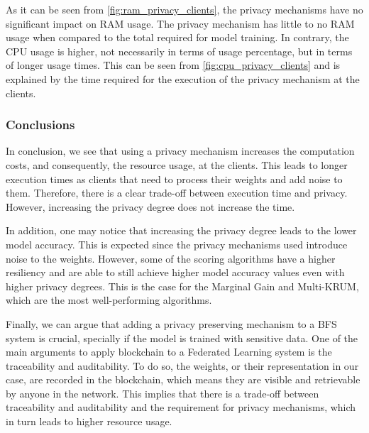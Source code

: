 As it can be seen from \autoref{fig:ram_privacy_clients}, the privacy mechanisms have no significant impact on RAM usage. The privacy mechanism has little to no RAM usage when compared to the total required for model training. In contrary, the CPU usage is higher, not necessarily in terms of usage percentage, but in terms of longer usage times. This can be seen from \autoref{fig:cpu_privacy_clients} and is explained by the time required for the execution of the privacy mechanism at the clients.

\subsubsection{Conclusions}

In conclusion, we see that using a privacy mechanism increases the computation costs, and consequently, the resource usage, at the clients. This leads to longer execution times as clients that need to process their weights and add noise to them. Therefore, there is a clear trade-off between execution time and privacy. However, increasing the privacy degree does not increase the time.

In addition, one may notice that increasing the privacy degree leads to the lower model accuracy. This is expected since the privacy mechanisms used introduce noise to the weights. However, some of the scoring algorithms have a higher resiliency and are able to still achieve higher model accuracy values even with higher privacy degrees. This is the case for the Marginal Gain and Multi-KRUM, which are the most well-performing algorithms.

Finally, we can argue that adding a privacy preserving mechanism to a BFS system is crucial, specially if the model is trained with sensitive data. One of the main arguments to apply blockchain to a Federated Learning system is the traceability and auditability. To do so, the weights, or their representation in our case, are recorded in the blockchain, which means they are visible and retrievable by anyone in the network. This implies that there is a trade-off between traceability and auditability and the requirement for privacy mechanisms, which in turn leads to higher resource usage.
